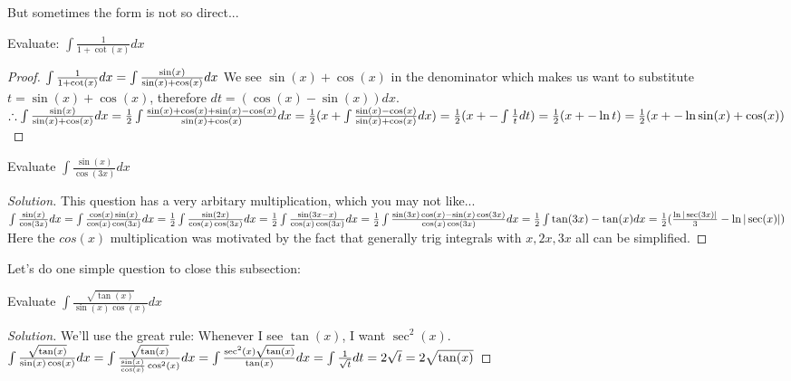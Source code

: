 But sometimes the form is not so direct...\\
\begin{example}
    Evaluate: $\int \frac{1}{1+\cot(x)} dx$
\end{example}
\begin{proof}
    $
    \int \frac{1}{1+\cot(x)} dx\\
    = \int \frac{\sin(x)}{\sin(x)+\cos(x)} dx$
    We see $\sin(x)+\cos(x)$ in the denominator which makes us want to substitute $t=\sin(x)+\cos(x)$, therefore $dt=(\cos(x)-\sin(x))dx$.\\
    $\therefore \int \frac{\sin(x)}{\sin(x)+\cos(x)} dx\\
    = \frac{1}{2}\int \frac{\sin(x)+\cos(x)+\sin(x)-\cos(x)}{\sin(x)+\cos(x)} dx
    = \frac{1}{2}(x+ \int \frac{\sin(x)-\cos(x)}{\sin(x)+\cos(x)} dx)
    = \frac{1}{2}(x+ -\int \frac{1}{t} dt)\\
    = \frac{1}{2}(x+ -\ln{t})\\
    = \frac{1}{2}(x+ -\ln{\sin(x)+\cos(x)})\\
    $
\end{proof}
\begin{example}
    Evaluate $\int \frac{\sin(x)}{\cos(3x)}dx$
\end{example}
\begin{proof}
    [Solution]
    This question has a very arbitary multiplication, which you may not like...\\
    $\int \frac{\sin(x)}{\cos(3x)}dx\\
    = \int \frac{\cos(x)\sin(x)}{\cos(x)\cos(3x)}dx\\
    = \frac{1}{2}\int \frac{\sin(2x)}{\cos(x)\cos(3x)}dx\\
    = \frac{1}{2}\int \frac{\sin(3x-x)}{\cos(x)\cos(3x)}dx\\
    = \frac{1}{2}\int \frac{\sin(3x)\cos(x)-\sin(x)\cos(3x)}{\cos(x)\cos(3x)}dx\\
    = \frac{1}{2}\int \tan(3x)-\tan(x)dx\\
    = \frac{1}{2}(\frac{\ln{|\sec(3x)|}}{3}-\ln{|\sec(x)|})
    $
    Here the $cos(x)$ multiplication was motivated by the fact that generally trig integrals with $x,2x,3x$ all can be simplified.
\end{proof}
Let's do one simple question to close this subsection:\\
    \begin{example}
        Evaluate $\int \frac{\sqrt{\tan(x)}}{\sin(x)\cos(x)}dx$
    \end{example}
    \begin{proof}
        [Solution]
        We'll use the great rule: Whenever I see $\tan(x)$, I want $\sec^2(x)$.\\
        $\int \frac{\sqrt{\tan(x)}}{\sin(x)\cos(x)}dx\\
        = \int \frac{\sqrt{\tan(x)}}{\frac{\sin(x)}{\cos(x)}\cos^2(x)}dx\\
        = \int \frac{\sec^2(x)\sqrt{\tan(x)}}{\tan(x)}dx\\
        = \int \frac{1}{\sqrt{t}}dt\\
        = 2\sqrt{t}\\
        = 2\sqrt{\tan(x)}$
    \end{proof}
